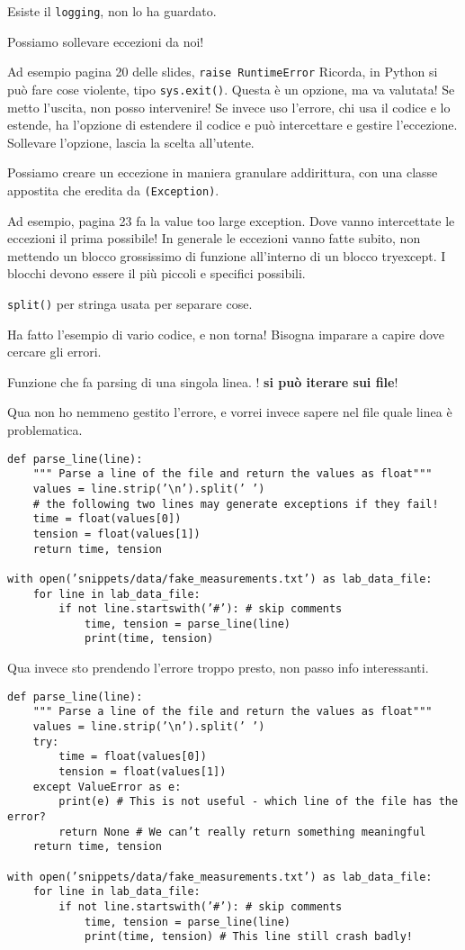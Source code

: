 \documentclass[10pt, a4paper, titlepage]{book}
\begin{document}
Esiste il \texttt{logging}, non lo ha guardato.

Possiamo sollevare eccezioni da noi!

Ad esempio pagina 20 delle slides, \texttt{raise RuntimeError}
Ricorda, in Python si può fare cose violente, tipo \texttt{sys.exit()}. Questa è un opzione, ma va valutata! Se metto l'uscita, non posso intervenire! Se invece uso l'errore, chi usa il codice e lo estende, ha l'opzione di estendere il codice e può intercettare e gestire l'eccezione. Sollevare l'opzione, lascia la scelta all'utente.

Possiamo creare un eccezione in maniera granulare addirittura, con una classe appostita che eredita da \texttt{(Exception)}.

Ad esempio, pagina 23 fa la value too large exception.
Dove vanno intercettate le eccezioni il prima possibile!
In generale le eccezioni vanno fatte subito, non mettendo un blocco grossissimo di funzione all'interno di un blocco tryexcept. I blocchi devono essere il più piccoli e specifici possibili.

\texttt{split()} per stringa usata per separare cose.

Ha fatto l'esempio di vario codice, e non torna! Bisogna imparare a capire dove cercare gli errori.

Funzione che fa parsing di una singola linea. ! \textbf{si può iterare sui file}!

Qua non ho nemmeno gestito l'errore, e vorrei invece sapere nel file quale linea è problematica.

\begin{verbatim}
def parse_line(line):
	""" Parse a line of the file and return the values as float"""
	values = line.strip(’\n’).split(’ ’)
	# the following two lines may generate exceptions if they fail!
	time = float(values[0])
	tension = float(values[1])
	return time, tension

with open(’snippets/data/fake_measurements.txt’) as lab_data_file:
	for line in lab_data_file:
		if not line.startswith(’#’): # skip comments
			time, tension = parse_line(line)
			print(time, tension)
\end{verbatim}

Qua invece sto prendendo l'errore troppo presto, non passo info interessanti.

\begin{verbatim}
def parse_line(line):
	""" Parse a line of the file and return the values as float"""
	values = line.strip(’\n’).split(’ ’)
	try:
		time = float(values[0])
		tension = float(values[1])
	except ValueError as e:
		print(e) # This is not useful - which line of the file has the error?
		return None # We can’t really return something meaningful
	return time, tension

with open(’snippets/data/fake_measurements.txt’) as lab_data_file:
	for line in lab_data_file:
		if not line.startswith(’#’): # skip comments
			time, tension = parse_line(line)
			print(time, tension) # This line still crash badly!
\end{verbatim}
\end{document}
